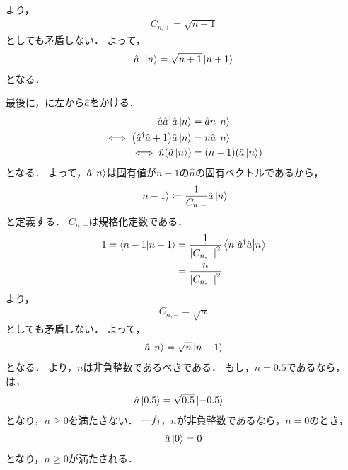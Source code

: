 \documentclass{report}
\begin{document}
    より，
    \begin{align}
      C_{n, +} = \sqrt{n + 1}
    \end{align}
    としても矛盾しない．
    よって，
    \begin{align}
      \hat{a}^{\dag}\ket{n} = \sqrt{n + 1}\ket{n + 1}\label{creation}
    \end{align}
    となる．
    \par
    最後に，に左から$\hat{a}$をかける．
    \begin{align}
      \hat{a}\hat{a}^{\dag}\hat{a}\ket{n} &= \hat{a}n\ket{n} \\ 
      \iff \qty(\hat{a}^{\dag}\hat{a} + 1)\hat{a}\ket{n} &= n\hat{a}\ket{n} \\ 
      \iff \hat{n}\qty(\hat{a}\ket{n}) &= (n - 1)\qty(\hat{a}\ket{n})
    \end{align}
    となる．
    よって，$\hat{a}\ket{n}$は固有値が$n - 1$の$\hat{n}$の固有ベクトルであるから，
    \begin{align}
      \ket{n - 1} &\coloneqq \frac{1}{C_{n, -}}\hat{a}\ket{n} \\ 
    \end{align}
    と定義する．
    $C_{n, -}$は規格化定数である．
    \begin{align}
      1 = \braket{n - 1}{n - 1} &= \frac{1}{\abs{C_{n, -}}^2}\mel**{n}{\hat{a}^{\dag}\hat{a}}{n} \\ 
      &= \frac{n}{\abs{C_{n, -}}^2}
    \end{align}
    より，
    \begin{align}
      C_{n, -} = \sqrt{n}
    \end{align}
    としても矛盾しない．
    よって，
    \begin{align}
      \hat{a}\ket{n} = \sqrt{n}\ket{n - 1}\label{annihilation}
    \end{align}
    となる．
    より，$n$は非負整数であるべきである．
    もし，$n = 0.5$であるなら，は，
    \begin{align}
      \hat{a}\ket{0.5} &= \sqrt{0.5}\ket{-0.5}
    \end{align}
    となり，$n \geq 0$を満たさない．
    一方，$n$が非負整数であるなら，$n = 0$のとき，
    \begin{align}
      \hat{a}\ket{0} = 0
    \end{align}
    となり，$n \geq 0$が満たされる．
\end{document}
